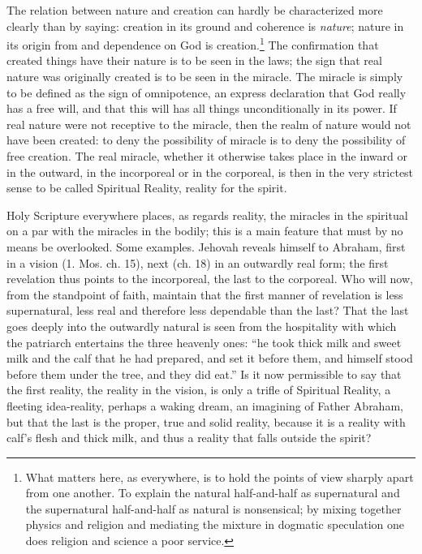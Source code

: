 \documentclass[12pt,a4paper,openany]{book}
\newcommand{\opage}[1]{\marginnote{\footnotesize\textit{[#1]}}}
\begin{document}
The relation between nature and creation can hardly be characterized
more clearly than by saying: creation in its
ground and coherence is \emph{nature}; nature in its origin
from and dependence on God is creation.\footnote[1]{What matters here, as everywhere, is to hold the points of view sharply apart from one another. To explain the natural half-and-half as supernatural and the supernatural half-and-half as natural is nonsensical; by mixing together physics and religion and mediating the mixture in dogmatic speculation one does religion and science a poor service.} The confirmation
that created things have their nature is
to be seen in the laws; the sign that real nature was originally
created is to be seen in the miracle. The miracle is simply
to be defined as the sign of omnipotence, an express
declaration that God really has a free will, and
that this will has all things unconditionally in its power.
If real nature were not receptive to the miracle,
then the realm of nature would not have been created: to deny the possibility of miracle
\setcounter{footnote}{0}%
\opage{10}is to deny the possibility of free creation. The
real miracle, whether it otherwise takes place in the
inward or in the outward, in the incorporeal or in
the corporeal, is then in the very strictest sense to be called
Spiritual Reality, reality for the spirit.

Holy Scripture everywhere places, as regards reality,
the miracles in the spiritual on a par with
the miracles in the bodily; this is a main feature that
must by no means be overlooked. Some examples. Jehovah
reveals himself to Abraham, first in a vision (1. Mos. ch. 15),
next (ch. 18) in an outwardly real form;
the first revelation thus points to the incorporeal,
the last to the corporeal. Who will now, from
the standpoint of faith, maintain that the first manner of revelation
is less supernatural, less real and therefore
less dependable than the last? That the last goes
deeply into the outwardly natural is seen from the hospitality
with which the patriarch entertains the three heavenly ones:
``he took thick milk and sweet milk and the calf that he
had prepared, and set it before them, and himself stood
before them under the tree, and they did eat.'' Is it now permissible
to say that the first reality, the reality in the vision,
is only a trifle of Spiritual Reality, a fleeting idea-reality,
perhaps a waking dream, an imagining of Father
Abraham, but that the last is the proper, true and
solid reality, because it is a reality with calf's flesh
and thick milk, and thus a reality that falls outside
the spirit?
\end{document}
